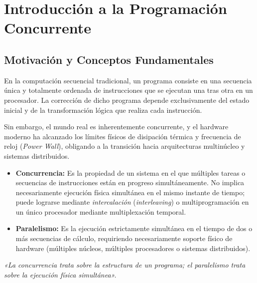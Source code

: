 \chapter{Introducción a la Programación Concurrente}
\label{cap:tema1}


\section{Motivación y Conceptos Fundamentales}

En la computación secuencial tradicional, un programa consiste en una secuencia única y totalmente ordenada de instrucciones que se ejecutan una tras otra en un procesador. La corrección de dicho programa depende exclusivamente del estado inicial y de la transformación lógica que realiza cada instrucción.

Sin embargo, el mundo real es inherentemente concurrente, y el hardware moderno ha alcanzado los límites físicos de disipación térmica y frecuencia de reloj (\textit{Power Wall}), obligando a la transición hacia arquitecturas multinúcleo y sistemas distribuidos.

\begin{definicion}
\begin{itemize}[leftmargin=*]
    \item \textbf{Concurrencia:} Es la propiedad de un sistema en el que múltiples tareas o secuencias de instrucciones están en progreso simultáneamente. No implica necesariamente ejecución física simultánea en el mismo instante de tiempo; puede lograrse mediante \textit{intercalación} (\textit{interleaving}) o multiprogramación en un único procesador mediante multiplexación temporal.
    \item \textbf{Paralelismo:} Es la ejecución estrictamente simultánea en el tiempo de dos o más secuencias de cálculo, requiriendo necesariamente soporte físico de hardware (múltiples núcleos, múltiples procesadores o sistemas distribuidos).
\end{itemize}
\textit{«La concurrencia trata sobre la estructura de un programa; el paralelismo trata sobre la ejecución física simultánea».}
\end{definicion}

